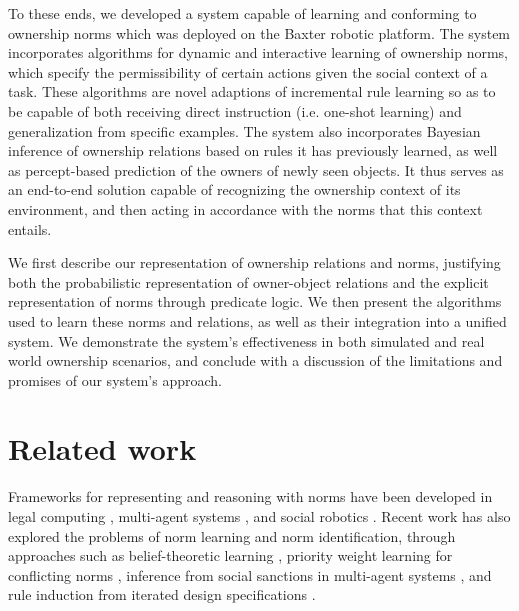 \documentclass[letterpaper]{article} %
\begin{document}
To these ends, we developed a system capable of learning and conforming to ownership norms which was deployed on the Baxter robotic platform. The system incorporates algorithms for dynamic and interactive learning of ownership norms, which specify the permissibility of certain actions given the social context of a task. These algorithms are novel adaptions of incremental rule learning so as to be capable of both receiving direct instruction (i.e. one-shot learning) and generalization from specific examples. The system also incorporates Bayesian inference of ownership relations based on rules it has previously learned, as well as percept-based prediction of the owners of newly seen objects. It thus serves as an end-to-end solution capable of recognizing the ownership context of its environment, and then acting in accordance with the norms that this context entails.

We first describe our representation of ownership relations and norms, justifying both the probabilistic representation of owner-object relations and the explicit representation of norms through predicate logic. We then present the algorithms used to learn these norms and relations, as well as their integration into a unified system. We demonstrate the system's effectiveness in both simulated and real world ownership scenarios, and conclude with a discussion of the limitations and promises of our system's approach.

\section{Related work}

Frameworks for representing and reasoning with norms have been developed in legal computing \cite{hoekstra2007lkif,palmirani2011legalruleml,lam2016enabling}, multi-agent systems \cite{vasconcelos2009normative,savarimuthu2011norm}, and social robotics  \cite{malle2017networks}. Recent work has also explored the problems of norm learning and norm identification, through approaches such as belief-theoretic learning \cite{sarathy2017learning}, priority weight learning for conflicting norms \cite{kasenberg2018inverse}, inference from social sanctions in multi-agent systems \cite{savarimuthu2010obligation,cranefield2015bayesian}, and rule induction from iterated design specifications \cite{corapi2011normative}.
\end{document}
